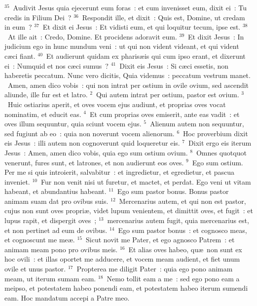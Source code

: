 ${}^{35}$~Audivit Jesus quia ejecerunt eum foras~: et cum invenisset eum, dixit ei~: Tu credis in Filium Dei~?
${}^{36}$~Respondit ille, et dixit~: Quis est, Domine, ut credam in eum~?
${}^{37}$~Et dixit ei Jesus~: Et vidisti eum, et qui loquitur tecum, ipse est.
${}^{38}$~At ille ait~: Credo, Domine. Et procidens adoravit eum.
${}^{39}$~Et dixit Jesus~: In judicium ego in hunc mundum veni~: ut qui non vident videant, et qui vident c\ae ci fiant.
${}^{40}$~Et audierunt quidam ex pharis\ae is qui cum ipso erant, et dixerunt ei~: Numquid et nos c\ae ci sumus~?
${}^{41}$~Dixit eis Jesus~: Si c\ae ci essetis, non haberetis peccatum. Nunc vero dicitis, Quia videmus~: peccatum vestrum manet.
~Amen, amen dico vobis~: qui non intrat per ostium in ovile ovium, sed ascendit aliunde, ille fur est et latro.
${}^{2}$~Qui autem intrat per ostium, pastor est ovium.
${}^{3}$~Huic ostiarius aperit, et oves vocem ejus audiunt, et proprias oves vocat nominatim, et educit eas.
${}^{4}$~Et cum proprias oves emiserit, ante eas vadit~: et oves illum sequuntur, quia sciunt vocem ejus.
${}^{5}$~Alienum autem non sequuntur, sed fugiunt ab eo~: quia non noverunt vocem alienorum.
${}^{6}$~Hoc proverbium dixit eis Jesus~: illi autem non cognoverunt quid loqueretur eis.
${}^{7}$~Dixit ergo eis iterum Jesus~: Amen, amen dico vobis, quia ego sum ostium ovium.
${}^{8}$~Omnes quotquot venerunt, fures sunt, et latrones, et non audierunt eos oves.
${}^{9}$~Ego sum ostium. Per me si quis introierit, salvabitur~: et ingredietur, et egredietur, et pascua inveniet.
${}^{10}$~Fur non venit nisi ut furetur, et mactet, et perdat. Ego veni ut vitam habeant, et abundantius habeant.
${}^{11}$~Ego sum pastor bonus. Bonus pastor animam suam dat pro ovibus suis.
${}^{12}$~Mercenarius autem, et qui non est pastor, cujus non sunt oves propri\ae , videt lupum venientem, et dimittit oves, et fugit~: et lupus rapit, et dispergit oves~;
${}^{13}$~mercenarius autem fugit, quia mercenarius est, et non pertinet ad eum de ovibus.
${}^{14}$~Ego sum pastor bonus~: et cognosco meas, et cognoscunt me me\ae .
${}^{15}$~Sicut novit me Pater, et ego agnosco Patrem~: et animam meam pono pro ovibus meis.
${}^{16}$~Et alias oves habeo, qu\ae\ non sunt ex hoc ovili~: et illas oportet me adducere, et vocem meam audient, et fiet unum ovile et unus pastor.
${}^{17}$~Propterea me diligit Pater~: quia ego pono animam meam, ut iterum sumam eam.
${}^{18}$~Nemo tollit eam a me~: sed ego pono eam a meipso, et potestatem habeo ponendi eam, et potestatem habeo iterum sumendi eam. Hoc mandatum accepi a Patre meo.


